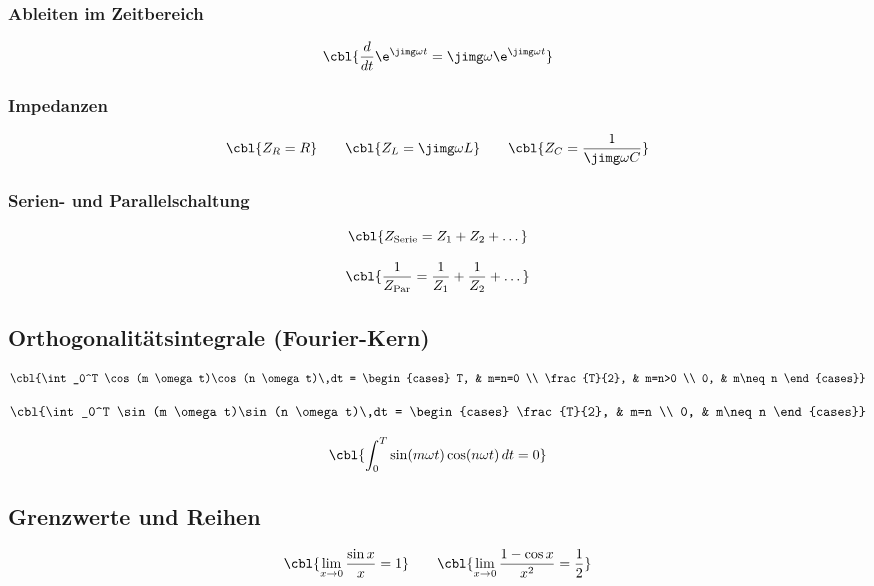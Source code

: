 \subsubsection{Ableiten im Zeitbereich}

\[
\cbl{\frac{d}{dt} \e^{\jimg \omega t} = \jimg \omega \e^{\jimg \omega t}}
\]

\subsubsection{Impedanzen}

\[
\cbl{Z_R = R}
\qquad
\cbl{Z_L = \jimg \omega L}
\qquad
\cbl{Z_C = \frac{1}{\jimg \omega C}}
\]

\subsubsection{Serien- und Parallelschaltung}

\[
\cbl{Z_{\mathrm{Serie}} = Z_1 + Z_2 + \dots}
\]

\[
\cbl{\frac{1}{Z_{\mathrm{Par}}} = \frac{1}{Z_1} + \frac{1}{Z_2} + \dots}
\]

\subsection{Orthogonalitätsintegrale (Fourier-Kern)}

\[
\cbl{\int_0^T \cos(m \omega t)\cos(n \omega t)\,dt =
\begin{cases}
T, & m=n=0 \\
\frac{T}{2}, & m=n>0 \\
0, & m\neq n
\end{cases}}
\]

\[
\cbl{\int_0^T \sin(m \omega t)\sin(n \omega t)\,dt =
\begin{cases}
\frac{T}{2}, & m=n \\
0, & m\neq n
\end{cases}}
\]

\[
\cbl{\int_0^T \sin(m \omega t)\cos(n \omega t)\,dt = 0}
\]

\subsection{Grenzwerte und Reihen}

\[
\cbl{\lim_{x \to 0} \frac{\sin x}{x} = 1}
\qquad
\cbl{\lim_{x \to 0} \frac{1 - \cos x}{x^2} = \frac{1}{2}}
\]

